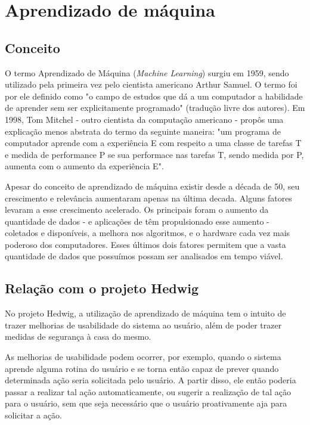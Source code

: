 \chapter{Aprendizado de máquina}

	\section{Conceito}
		O termo Aprendizado de Máquina (\emph{Machine Learning}) surgiu em 1959, sendo utilizado pela primeira vez  pelo cientista americano Arthur Samuel. O termo foi por ele definido como "o campo de estudos que dá a um computador a habilidade de aprender sem ser explicitamente programado" (tradução livre dos autores). Em 1998, Tom Mitchel - outro cientista da computação americano - propôs uma explicação menos abstrata do termo da seguinte maneira: "um programa de computador aprende com a experiência E com respeito a uma classe de tarefas T e medida de performance P se sua performace nas tarefas T, sendo medida por P, aumenta com o aumento da experiência E".

		Apesar do conceito de aprendizado de máquina existir desde a década de 50, seu crescimento e relevância aumentaram apenas na última decada. Alguns fatores levaram a esse crescimento acelerado. Os principais foram o aumento da quantidade de dados - e aplicações de \wiot têm propulsionado esse aumento - coletados e disponíveis, a melhora nos algoritmos, e o hardware cada vez mais poderoso dos computadores. Esses últimos dois fatores permitem que a vasta quantidade de dados que possuímos possam ser analisados em tempo viável.

	\section{Relação com o projeto Hedwig}
		No projeto Hedwig, a utilização de aprendizado de máquina tem o intuito de trazer melhorias de usabilidade do sistema ao usuário, além de poder trazer medidas de segurança à casa do mesmo.

		As melhorias de usabilidade podem ocorrer, por exemplo, quando o sistema aprende alguma rotina do usuário e se torna então capaz de prever quando determinada ação seria solicitada pelo usuário. A partir disso, ele então poderia passar a realizar tal ação automaticamente, ou sugerir a realização de tal ação para o usuário, sem que seja necessário que o usuário proativamente aja para solicitar a ação.

